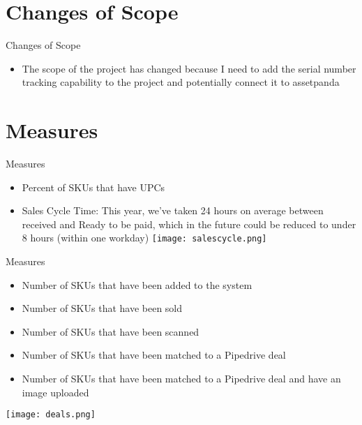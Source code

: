 \documentclass[aspectratio=1610]{beamer}
\begin{document}
\section{Changes of Scope}
\begin{frame}{Changes of Scope}
    \begin{itemize}
        \item The scope of the project has changed because I need to add the serial number tracking capability to the project and potentially connect it to assetpanda 
    \end{itemize}
\end{frame}
\section{Measures}
\begin{frame}{Measures}
    \begin{itemize}
        \item Percent of SKUs that have UPCs 
        \item Sales Cycle Time: This year, we've taken 24 hours on average between received and Ready to be paid, which in the future could be reduced to under 8 hours (within one workday) 
        \texttt{[image: salescycle.png]}
    \end{itemize}
\end{frame}
\begin{frame}{Measures}
    \begin{itemize}
        \item Number of SKUs that have been added to the system
        \item Number of SKUs that have been sold
        \item Number of SKUs that have been scanned
        \item Number of SKUs that have been matched to a Pipedrive deal
        \item Number of SKUs that have been matched to a Pipedrive deal and have an image uploaded
    \end{itemize}
    \texttt{[image: deals.png]}

\end{frame}
\end{document}
